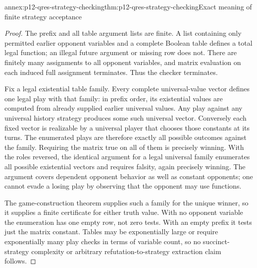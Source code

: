 \begin{annexitem}{annex:p12-qres-strategy-checking}{thm:p12-qres-strategy-checking}{Exact meaning of finite strategy acceptance}
\begin{proof}
The prefix and all table argument lists are finite.  A list containing only
permitted earlier opponent variables and a complete Boolean table defines
a total legal function; an illegal future argument or missing row does not.
There are finitely many assignments to all opponent variables, and matrix
evaluation on each induced full assignment terminates.  Thus the checker
terminates.

Fix a legal existential table family.  Every complete universal-value vector
defines one legal play with that family: in prefix order, its existential
values are computed from already supplied earlier universal values.  Any
play against any universal history strategy produces some such universal
vector.  Conversely each fixed vector is realizable by a universal player
that chooses those constants at its turns.  The enumerated plays are
therefore exactly all possible outcomes against the family.  Requiring the
matrix true on all of them is precisely winning.  With the roles reversed,
the identical argument for a legal universal family enumerates all possible
existential vectors and requires falsity, again precisely winning.  The
argument covers dependent opponent behavior as well as constant opponents;
one cannot evade a losing play by observing that the opponent may use functions.

The game-construction theorem supplies such a family for the unique winner,
so it supplies a finite certificate for either truth value.  With no
opponent variable the enumeration has one empty row, not zero tests.
With an empty prefix it tests just the matrix constant.  Tables may be
exponentially large or require exponentially many play checks in terms
of variable count, so no succinct-strategy complexity or arbitrary
refutation-to-strategy extraction claim follows.
\end{proof}
\end{annexitem}

